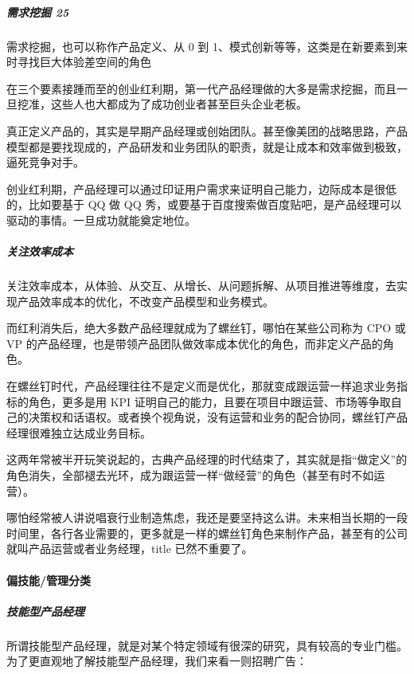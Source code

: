 \documentclass[letterpaper,10pt,english]{sphinxmanual}
\begin{document}
\subparagraph{需求挖掘 25\sphinxfootnotemark[192]}
\label{\detokenize{chapter_introduction/PM:id35}}%
\begin{footnotetext}[192]\sphinxAtStartFootnote
{}
%
\end{footnotetext}\ignorespaces 
需求挖掘，也可以称作产品定义、从 0 到
1、模式创新等等，这类是在新要素到来时寻找巨大体验差空间的角色

在三个要素接踵而至的创业红利期，第一代产品经理做的大多是需求挖掘，而且一旦挖准，这些人也大都成为了成功创业者甚至巨头企业老板。

真正定义产品的，其实是早期产品经理或创始团队。甚至像美团的战略思路，产品模型都是要找现成的，产品研发和业务团队的职责，就是让成本和效率做到极致，逼死竞争对手。

创业红利期，产品经理可以通过印证用户需求来证明自己能力，边际成本是很低的，比如要基于
QQ 做 QQ
秀，或要基于百度搜索做百度贴吧，是产品经理可以驱动的事情。一旦成功就能奠定地位。


\subparagraph{关注效率成本}
\label{\detokenize{chapter_introduction/PM:id36}}
关注效率成本，从体验、从交互、从增长、从问题拆解、从项目推进等维度，去实现产品效率成本的优化，不改变产品模型和业务模式。

而红利消失后，绝大多数产品经理就成为了螺丝钉，哪怕在某些公司称为 CPO 或
VP
的产品经理，也是带领产品团队做效率成本优化的角色，而非定义产品的角色。

在螺丝钉时代，产品经理往往不是定义而是优化，那就变成跟运营一样追求业务指标的角色，更多是用
KPI
证明自己的能力，且要在项目中跟运营、市场等争取自己的决策权和话语权。或者换个视角说，没有运营和业务的配合协同，螺丝钉产品经理很难独立达成业务目标。

这两年常被半开玩笑说起的，古典产品经理的时代结束了，其实就是指“做定义”的角色消失，全部褪去光环，成为跟运营一样“做经营”的角色（甚至有时不如运营）。

哪怕经常被人讲说唱衰行业制造焦虑，我还是要坚持这么讲。未来相当长期的一段时间里，各行各业需要的，更多就是一样的螺丝钉角色来制作产品，甚至有的公司就叫产品运营或者业务经理，title
已然不重要了。


\paragraph{偏技能/管理分类}
\label{\detokenize{chapter_introduction/PM:id37}}

\subparagraph{技能型产品经理}
\label{\detokenize{chapter_introduction/PM:id38}}\label{\detokenize{chapter_introduction/PM:id39}}
所谓技能型产品经理，就是对某个特定领域有很深的研究，具有较高的专业门槛。为了更直观地了解技能型产品经理，我们来看一则招聘广告：
\end{document}
